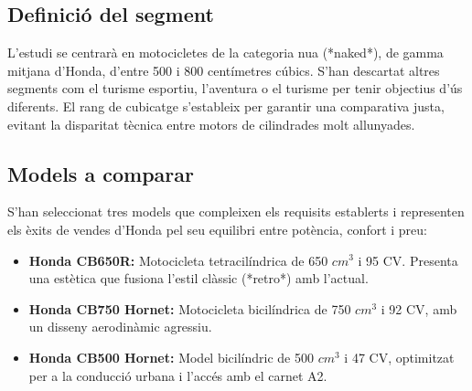 \subsection{Definició del segment}
L’estudi se centrarà en motocicletes de la categoria nua (*naked*), de gamma mitjana d'Honda, d'entre 500 i 800 centímetres cúbics. S'han descartat altres segments com el turisme esportiu, l'aventura o el turisme per tenir objectius d'ús diferents. El rang de cubicatge s'estableix per garantir una comparativa justa, evitant la disparitat tècnica entre motors de cilindrades molt allunyades.

\subsection{Models a comparar}
S'han seleccionat tres models que compleixen els requisits establerts i representen els èxits de vendes d'Honda pel seu equilibri entre potència, confort i preu:

\begin{itemize}
    \item \textbf{Honda CB650R:} Motocicleta tetracilíndrica de 650 $cm^3$ i 95 CV. Presenta una estètica que fusiona l'estil clàssic (*retro*) amb l'actual.
    \item \textbf{Honda CB750 Hornet:} Motocicleta bicilíndrica de 750 $cm^3$ i 92 CV, amb un disseny aerodinàmic agressiu.
    \item \textbf{Honda CB500 Hornet:} Model bicilíndric de 500 $cm^3$ i 47 CV, optimitzat per a la conducció urbana i l'accés amb el carnet A2.
\end{itemize}
